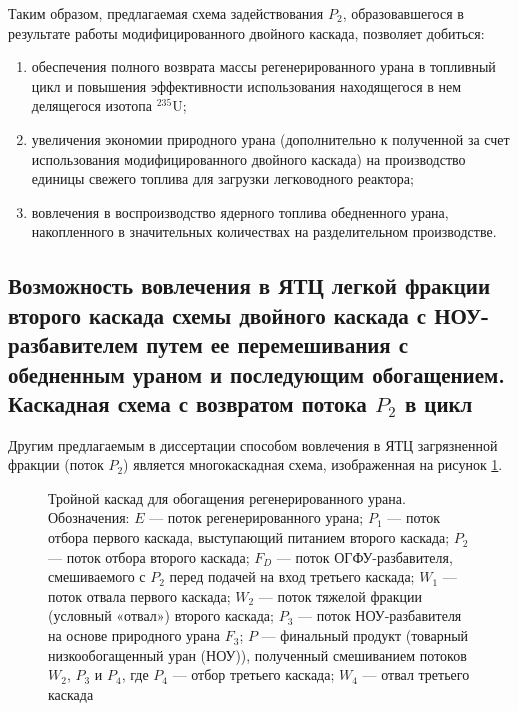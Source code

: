 Таким образом, предлагаемая схема задействования $P_2$, образовавшегося в результате работы модифицированного двойного каскада, позволяет добиться:
\begin{enumerate}
  \item обеспечения полного возврата массы регенерированного урана в топливный цикл и повышения эффективности использования находящегося в нем делящегося изотопа $^{235}$U;
  \item увеличения экономии природного урана (дополнительно к полученной за счет использования модифицированного двойного каскада)  на производство единицы свежего топлива для загрузки легководного реактора;
  \item вовлечения в воспроизводство ядерного топлива обедненного урана, накопленного в значительных количествах на разделительном производстве.
\end{enumerate}

\subsection{Возможность вовлечения в ЯТЦ легкой фракции второго каскада схемы двойного каскада с НОУ-разбавителем путем ее перемешивания с обедненным ураном и последующим обогащением. Каскадная схема с возвратом потока $P_2$ в цикл}\label{triple_c}

Другим предлагаемым в диссертации способом вовлечения в ЯТЦ загрязненной фракции (поток $P_2$) является многокаскадная схема, изображенная на рисунок \ref{p2_withDepU}.

\begin{figure}[ht]
    \caption{Тройной каскад для обогащения регенерированного урана. Обозначения: $E$ --- поток регенерированного урана; $P_1$ --- поток отбора первого каскада, выступающий питанием второго каскада; $P_2$ --- поток отбора второго каскада; $F_{D}$ --- поток ОГФУ-разбавителя, смешиваемого с $P_2$ перед подачей на вход третьего каскада; $W_1$ --- поток отвала первого каскада; $W_2$ --- поток тяжелой фракции (условный «отвал») второго каскада; $P_3$ --- поток НОУ-разбавителя на основе природного урана $F_3$; $P$ --- финальный продукт (товарный низкообогащенный уран (НОУ)), полученный смешиванием потоков $W_2$, $P_3$ и $P_4$, где $P_4$ --- отбор третьего каскада; $W_4$ --- отвал третьего каскада}\label{p2_withDepU}
\end{figure}

